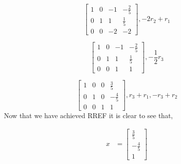 \documentclass{amsart}
\begin{document}
\begin{equation}
\begin{bmatrix}
1&0&-1&-\frac{2}{5}\\
0&1&1&\frac{1}{5}\\
0&0&-2&-2
\end{bmatrix}, -2r_2+r_1
\end{equation}

\begin{equation}
\begin{bmatrix}
1&0&-1&-\frac{2}{5}\\
0&1&1&\frac{1}{5}\\
0&0&1&1
\end{bmatrix}, -\frac{1}{2}r_3
\end{equation}

\begin{equation}
\begin{bmatrix}
1&0&0&\frac{3}{5}\\
0&1&0&-\frac{4}{5}\\
0&0&1&1
\end{bmatrix}, r_3+r_1, -r_3+r_2
\end{equation}
Now that we have achieved RREF it is clear to see that,

\begin{align}
x&=
\begin{bmatrix}
\frac{3}{5}\\
-\frac{4}{5}\\
1
\end{bmatrix}
\end{align}






\vspace{1in}
\end{document}
